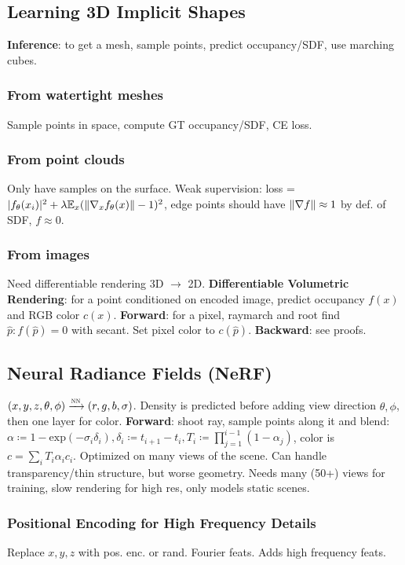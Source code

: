 \documentclass[11pt,landscape,a4paper,fleqn]{article}
\newcommand{\E}{\mathbb{E}}
\renewcommand{\exp}{\mathrm{exp}}
\begin{document}
\begin{multicols*}{4}
\subsection{Learning 3D Implicit Shapes}

\textbf{Inference}: to get a mesh, sample points, predict occupancy/SDF, use marching cubes.

\subsubsection{From watertight meshes}
Sample points in space, compute GT occupancy/SDF, CE loss.

\subsubsection{From point clouds} Only have samples on the surface.
Weak supervision: loss = $|f_\theta(x_i)|^2 + \lambda \E_x(\norm{\nabla_x f_\theta(x)} - 1)^2$,
edge points should have $\norm{\nabla f} \approx 1$ by def. of SDF, $f \approx 0$.

\subsubsection{From images} Need differentiable rendering 3D $\to$ 2D.
\textbf{Differentiable Volumetric Rendering}: for a point conditioned on encoded image,
predict occupancy $f(x)$ and RGB color $c(x)$.
\textbf{Forward}: for a pixel, raymarch and root find $\hat{p} : f(\hat{p}) = 0$ with secant. Set pixel color to $c(\hat{p})$.
\textbf{Backward}: see proofs.

\subsection{Neural Radiance Fields (NeRF)} \phantom{a}

$(x, y, z, \theta, \phi) \xrightarrow{\textsc{nn}} (r, g, b, \sigma)$.
Density is predicted before adding view direction $\theta, \phi$,
then one layer for color.
\textbf{Forward}: shoot ray, sample points along it and blend:
$\alpha \coloneqq 1 - \exp( - \sigma_i \delta_i), \delta_i \coloneqq t_{i+1} - t_i,
T_i \coloneqq \prod_{j = 1}^{i-1}(1 - \alpha_j)$,
color is $c = \sum_i T_i \alpha_i c_i$.
Optimized on many views of the scene.
Can handle transparency/thin structure,
but worse geometry.
Needs many (50+) views for training, slow rendering for high res,
only models static scenes.

\subsubsection{Positional Encoding for High Frequency Details}
Replace $x, y, z$ with pos. enc. or rand. Fourier feats.
Adds high frequency feats.


\end{multicols*}
\end{document}
